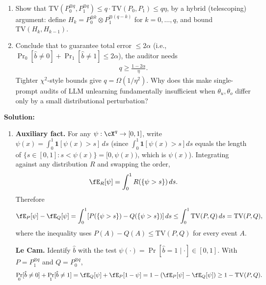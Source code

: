 \documentclass[12pt]{article}
\begin{document}
\begin{enumerate}
\begin{enumerate}
    \item Show that $\mathrm{TV}(P_0^{\otimes q}, P_1^{\otimes q}) \le q \cdot \mathrm{TV}(P_0, P_1) \le q\eta$, by a hybrid (telescoping) argument: define $H_k = P_0^{\otimes k} \otimes P_1^{\otimes (q-k)}$ for $k = 0, \ldots, q$, and bound $\mathrm{TV}(H_k, H_{k-1})$.

    \item Conclude that to guarantee total error $\le 2\alpha$ (i.e., $\Pr_0[\hat b \ne 0] + \Pr_1[\hat b \ne 1] \le 2\alpha$), the auditor needs
    \begin{align*}
        q \ge \frac{1 - 2\alpha}{\eta}.
    \end{align*}
    Tighter $\chi^2$-style bounds give $q = \Omega(1/\eta^2)$. Why does this make single-prompt audits of LLM unlearning fundamentally insufficient when $\theta_u, \theta_o$ differ only by a small distributional perturbation?
\end{enumerate}

\begin{solution}
{\bf Solution:}\\
\begin{enumerate}
    \item \textbf{Auxiliary fact.} For any $\psi : \cX^q \to [0, 1]$, write $\psi(x) = \int_0^1 \mathbf{1}[\psi(x) > s]\, ds$ (since $\int_0^1 \mathbf{1}[\psi(x) > s] ds$ equals the length of $\{s \in [0, 1] : s < \psi(x)\} = [0, \psi(x))$, which is $\psi(x)$). Integrating against any distribution $R$ and swapping the order,
    \begin{align*}
        \fE_R[\psi] = \int_0^1 R(\{\psi > s\})\, ds.
    \end{align*}
    Therefore
    \begin{align*}
        \fE_P[\psi] - \fE_Q[\psi] = \int_0^1 [P(\{\psi > s\}) - Q(\{\psi > s\})]\, ds \le \int_0^1 \mathrm{TV}(P, Q)\, ds = \mathrm{TV}(P, Q),
    \end{align*}
    where the inequality uses $P(A) - Q(A) \le \mathrm{TV}(P, Q)$ for every event $A$.

    \textbf{Le Cam.} Identify $\hat b$ with the test $\psi(\cdot) = \Pr[\hat b = 1 \mid \cdot] \in [0, 1]$. With $P = P_1^{\otimes q}$ and $Q = P_0^{\otimes q}$,
    \begin{align*}
        \Pr_0[\hat b \ne 0] + \Pr_1[\hat b \ne 1] = \fE_Q[\psi] + \fE_P[1 - \psi] = 1 - (\fE_P[\psi] - \fE_Q[\psi]) \ge 1 - \mathrm{TV}(P, Q).
    \end{align*}


\end{enumerate}
\end{solution}
\end{enumerate}
\end{document}
